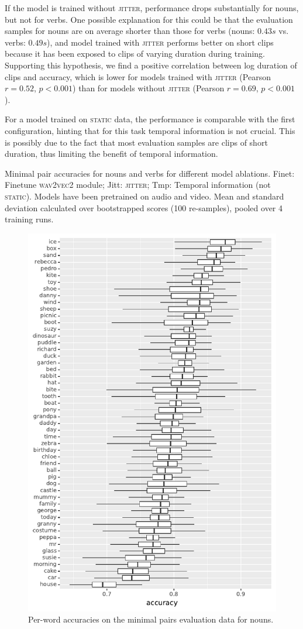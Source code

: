 If the model is trained without \textsc{jitter}, performance drops substantially
for nouns, but not for verbs. One possible explanation for this could be that 
the evaluation samples for nouns are on average shorter than those for verbs 
(nouns: $0.43s$ vs. verbs: $0.49s$), and model trained with \textsc{jitter} 
performs better on short clips because it has been exposed to clips of varying 
duration during training. Supporting this hypothesis, we find a positive 
correlation between log duration of clips and accuracy, which is lower for 
models trained with \textsc{jitter} (Pearson $r= 0.52$, $p < 0.001$) than for 
models without \textsc{jitter} (Pearson $r= 0.69$, $p < 0.001$).

For a model trained on \textsc{static} data, the performance is
comparable with the first configuration, hinting that for this task
temporal information is not crucial. This is possibly due to the fact
that most evaluation samples are clips of short duration, thus limiting
the benefit of temporal information.
\begin{table}[htb]
	
	\caption{Minimal pair accuracies for nouns and verbs for different model 
		ablations. Finet: Finetune \textsc{wav2vec2} module; 
		Jitt: \textsc{jitter}; Tmp: Temporal information (not \textsc{static}). 
		Models have been pretrained on audio and video. Mean and standard 
		deviation calculated over bootstrapped scores (100 re-samples), pooled 
		over 4 training runs.}
	\label{tab:minimal_pair_results}
\end{table}


\begin{figure}[htb]
  \centering
  \includegraphics[width=.5\textwidth]{results/targeted_triplets/acc_per_word_NOUN.pdf}
  \caption{Per-word accuracies on the minimal pairs evaluation data for nouns.}
  \label{fig:accuracy_targeted_triplets_nouns}
\end{figure}


